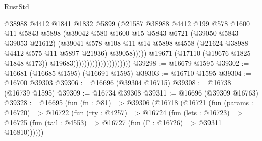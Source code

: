 \begin{lexlean}{RustStd}
\begin{coremodule}
                                                  @38988
                                                  @4412
                                                  @1841
                                                  @1832
                                                  @5899
                                                  (@21587
                                                    @38988
                                                    @4412
                                                    @199
                                                    @578
                                                    @1600
                                                    @11
                                                    @5843
                                                    @5898
                                                    (@39042
                                                      @580
                                                      @1600
                                                      @15
                                                      @5843
                                                      @6721
                                                      (@39050 @5843 @39053 @21612)
                                                      (@39041
                                                        @578
                                                        @108
                                                        @11
                                                        @14
                                                        @5898
                                                        @4558
                                                        (@21624 @38988 @4412 @575 @11 @5897 @21936)
                                                        @39058)))))
                                              @19671
                                              (@17110 (@19676 @1825 @1848 @173))
                                              @19683)))))))))))))))))))))
@39298 := @16679 @1595
@39302 := @16681 (@16685 @1595) (@16691 @1595)
@39303 := @16710 @1595
@39304 := @16700 @39303
@39306 := @16696 (@39304 @16715)
@39308 := @16738 (@16739 @1595)
@39309 := @16734 @39308
@39311 := @16696 (@39309 @16763)
@39328 := @16695
    (fun (fn : @81) =>
    @39306
      (@16718
        (@16721
          (fun (params : @16720) =>
          @16722
            (fun (rty : @4257) =>
            @16724
              (fun (lets : @16723) =>
              @16725 (fun (tail : @4553) => @16727 (fun (Γ : @16726) => @39311 @16810))))))

\end{coremodule}
\end{lexlean}
